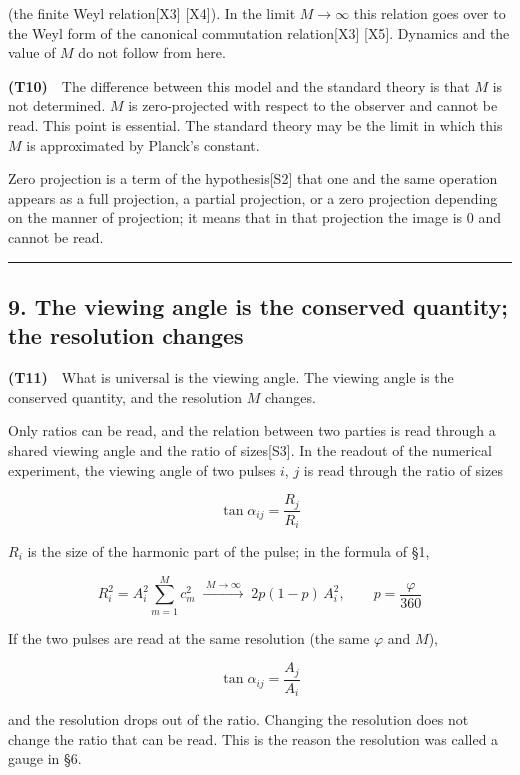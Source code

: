 \documentclass[
  a4paper,
]{article}
\begin{document}
(the finite Weyl relation{[}X3{]} {[}X4{]}). In the limit \(M\to\infty\)
this relation goes over to the Weyl form of the canonical commutation
relation{[}X3{]} {[}X5{]}. Dynamics and the value of \(M\) do not follow
from here.

\textbf{(T10)}　The difference between this model and the standard
theory is that \(M\) is not determined. \(M\) is zero-projected with
respect to the observer and cannot be read. This point is essential. The
standard theory may be the limit in which this \(M\) is approximated by
Planck's constant.

Zero projection is a term of the hypothesis{[}S2{]} that one and the
same operation appears as a full projection, a partial projection, or a
zero projection depending on the manner of projection; it means that in
that projection the image is 0 and cannot be read.

\begin{center}\rule{0.5\linewidth}{0.5pt}\end{center}

\subsection{9. The viewing angle is the conserved quantity; the
resolution
changes}\label{the-viewing-angle-is-the-conserved-quantity-the-resolution-changes}

\textbf{(T11)}　What is universal is the viewing angle. The viewing
angle is the conserved quantity, and the resolution \(M\) changes.

Only ratios can be read, and the relation between two parties is read
through a shared viewing angle and the ratio of sizes{[}S3{]}. In the
readout of the numerical experiment, the viewing angle of two pulses
\(i\), \(j\) is read through the ratio of sizes

\[
\tan\alpha_{ij}=\frac{R_j}{R_i}
\]

\(R_i\) is the size of the harmonic part of the pulse; in the formula of
§1,

\[
R_i^{2}=A_i^{2}\sum_{m=1}^{M}c_m^{2}\;\xrightarrow{\;M\to\infty\;}\;2p(1-p)\,A_i^{2},\qquad p=\frac{\varphi}{360}
\]

If the two pulses are read at the same resolution (the same \(\varphi\)
and \(M\)),

\[
\tan\alpha_{ij}=\frac{A_j}{A_i}
\]

and the resolution drops out of the ratio. Changing the resolution does
not change the ratio that can be read. This is the reason the resolution
was called a gauge in §6.
\end{document}

